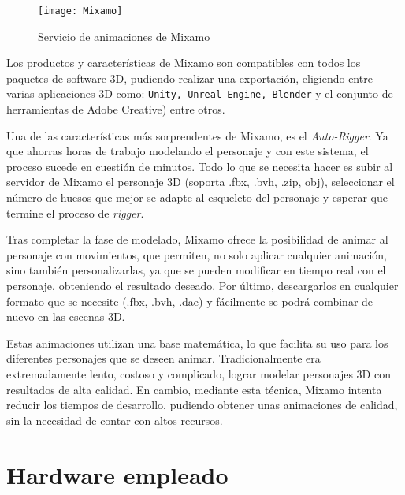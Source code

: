 \begin{figure}[h]
    \centering 
    \texttt{[image: Mixamo]}
    \caption{Servicio de animaciones de Mixamo}
    \label{fig:Mixamo} 
\end{figure} 

Los productos y características de Mixamo son compatibles con todos los paquetes de software 3D, pudiendo realizar una exportación, eligiendo entre varias aplicaciones 3D como: \texttt{Unity, Unreal Engine, Blender} y el conjunto de herramientas de Adobe Creative) entre otros.

Una de las características más sorprendentes de Mixamo, es el \textit{Auto-Rigger}. Ya que ahorras horas de trabajo modelando el personaje y con este sistema, el proceso sucede en cuestión de minutos. Todo lo que se necesita hacer es subir al servidor de Mixamo el personaje 3D (soporta .fbx, .bvh, .zip, obj), seleccionar el número de huesos que mejor se adapte al esqueleto del personaje y esperar que termine el proceso de \textit{rigger}.

Tras completar la fase de modelado, Mixamo ofrece la posibilidad de animar al personaje con movimientos, que permiten, no solo aplicar cualquier animación, sino también personalizarlas, ya que se pueden modificar en tiempo real con el personaje, obteniendo el resultado deseado. Por último, descargarlos en cualquier formato que se necesite (.fbx, .bvh, .dae) y fácilmente se podrá combinar de nuevo en las escenas 3D.

Estas animaciones utilizan una base matemática, lo que facilita su uso para los diferentes personajes que se deseen animar. Tradicionalmente era extremadamente lento, costoso y complicado, lograr modelar personajes 3D con resultados de alta calidad. En cambio, mediante esta técnica, Mixamo intenta reducir los tiempos de desarrollo, pudiendo obtener unas animaciones de calidad, sin la necesidad de contar con altos recursos. 

\section{Hardware empleado}
\label{cap4:sec:hardware empleado}